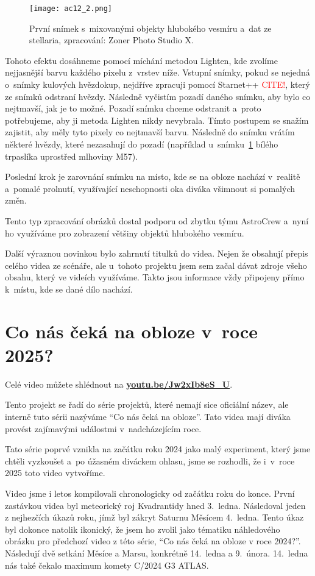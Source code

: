 \documentclass[12pt,a4paper,titlepage]{article}
\newcommand{\link}[2]{\href{#1}{\textcolor{link-color}{\textbf{#2}}}}%
\newcommand{\todo}[1]{\textcolor{red}{#1}}
\begin{document}
\begin{figure}[H]
	\centering
	\texttt{[image: ac12\_2.png]}
	\caption{První snímek s~mixovanými objekty hlubokého vesmíru a~dat ze stellaria, zpracování: Zoner Photo Studio X.}\label{prac:ac12_2}
\end{figure}

Tohoto efektu dosáhneme pomocí míchání metodou Lighten, kde zvolíme nejjasnější barvu každého pixelu z~vrstev níže. Vstupní snímky, pokud se nejedná o~snímky kulových hvězdokup, nejdříve zpracuji pomocí Starnet++ \todo{CITE!}, který ze snímků odstraní hvězdy. Následně vyčistím pozadí daného snímku, aby bylo co nejtmavší, jak je to možné. Pozadí snímku chceme odstranit a~proto potřebujeme, aby ji metoda Lighten nikdy nevybrala. Tímto postupem se snažím zajistit, aby měly tyto pixely co nejtmavší barvu. Následně do snímku vrátím některé hvězdy, které nezasahují do pozadí (například u~snímku~\ref{prac:ac12_2} bílého trpaslíka uprostřed mlhoviny M57).

Poslední krok je zarovnání snímku na místo, kde se na obloze nachází v~realitě a~pomalé prolnutí, využívající neschopnosti oka diváka všimnout si pomalých změn.

Tento typ zpracování obrázků dostal podporu od zbytku týmu AstroCrew a~nyní ho využíváme pro zobrazení většiny objektů hlubokého vesmíru.

Další výraznou novinkou bylo zahrnutí titulků do videa. Nejen že obsahují přepis celého videa ze scénáře, ale u~tohoto projektu jsem sem začal dávat zdroje všeho obsahu, který ve videích využíváme. Takto jsou informace vždy připojeny přímo k~místu, kde se dané dílo nachází.

\section{Co nás čeká na obloze v~roce 2025?}
Celé video můžete shlédnout na \link{https://youtu.be/Jw2xIb8eS\_U}{youtu.be/Jw2xIb8eS\_U}.

Tento projekt se řadí do série projektů, které nemají sice oficiální název, ale interně tuto sérii nazýváme \enquote{Co nás čeká na obloze}. Tato videa mají diváka provést zajímavými událostmi v~nadcházejícím roce.

Tato série poprvé vznikla na začátku roku 2024 jako malý experiment, který jsme chtěli vyzkoušet a~po úžasném diváckem ohlasu, jsme se rozhodli, že i~v~roce 2025 toto video vytvoříme.

Video jsme i letos kompilovali chronologicky od začátku roku do konce. První zastávkou videa byl meteorický roj Kvadrantidy hned 3.\ ledna. Následoval jeden z nejhezčích úkazů roku, jímž byl zákryt Saturnu Měsícem 4.\ ledna. Tento úkaz byl dokonce natolik ikonický, že jsem ho zvolil jako tématiku náhledového obrázku pro předchozí video z této série, \enquote{Co nás čeká na obloze v roce 2024?}. Následují dvě setkání Měsíce a Marsu, konkrétně 14.\ ledna a 9.\ února. 14.\ ledna nás také čekalo maximum komety C/2024 G3 ATLAS.\@
\end{document}
